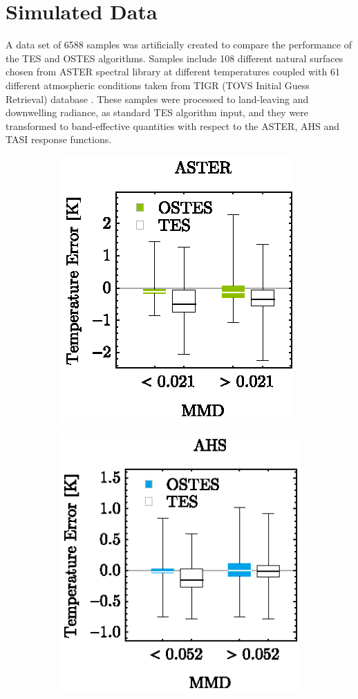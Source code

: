 \section{Simulated Data}

A data set of 6588 samples was artificially created to compare the performance of the TES and OSTES algorithms. Samples include 108 different natural surfaces chosen from ASTER spectral library \cite{BH09} at different temperatures coupled with 61 different atmospheric conditions taken from TIGR (TOVS Initial Guess Retrieval) database \cite{CS85, CC98}. 
These samples were processed to land-leaving and downwelling radiance, as standard TES algorithm input, and they were transformed to band-effective quantities with respect to the ASTER, AHS and TASI response functions.

\begin{figure}[!t]
	\centering
	\vspace{1em}
	\begin{subfigure}[t]{.3\linewidth}
		\centering
		\includegraphics[scale=1]{pics/Chapter_04/Simulated_data_ASTER.eps}
		\caption{}
	\end{subfigure}
	\hspace{1em}
	\begin{subfigure}[t]{.3\linewidth}
		\centering
		\includegraphics[scale=1]{pics/Chapter_04/Simulated_data_AHS.eps}

\end{subfigure}
\end{figure}
